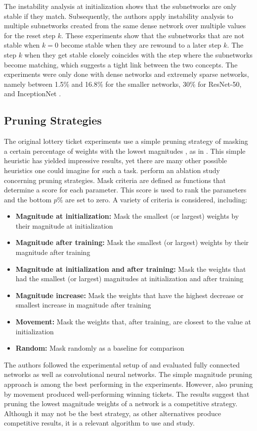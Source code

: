 The instability analysis at initialization shows that the subnetworks are only stable if they match.
Subsequently, the authors apply instability analysis to multiple subnetworks created from the same dense network over multiple values for the reset step $k$.
These experiments show that the subnetworks that are not stable when $k=0$ become stable when they are rewound to a later step $k$.
The step $k$ when they get stable closely coincides with the step where the subnetworks become matching, which suggests a tight link between the two concepts.
The experiments were only done with dense networks and extremely sparse networks, namely between 1.5\% and 16.8\% for the smaller networks, 30\% for ResNet-50, and InceptionNet \autocite{LinearModeConnectivity}.

\subsection{Pruning Strategies}
The original lottery ticket experiments use a simple pruning strategy of masking a certain percentage of weights with the lowest magnitudes \autocite{LTH}, as in \autocite{HanEtAl15}. This simple heuristic has yielded impressive results, yet there are many other possible heuristics one could imagine for such a task.
\textcite{Supermasks} perform an ablation study concerning pruning strategies. Mask criteria are defined as functions that determine a score for each parameter. This score is used to rank the parameters and the bottom $p\%$ are set to zero.
A variety of criteria is considered, including: 
\begin{itemize}
\item \textbf{Magnitude at initialization:} Mask the smallest (or largest) weights by their magnitude at initialization
\item \textbf{Magnitude after training:} Mask the smallest (or largest) weights by their magnitude after training
\item \textbf{Magnitude at initialization and after training:} Mask the weights that had the smallest (or largest) magnitudes at initialization and after training
\item \textbf{Magnitude increase:} Mask the weights that have the highest decrease or smallest increase in magnitude after training
\item \textbf{Movement:} Mask the weights that, after training, are closest to the value at initialization
\item \textbf{Random:} Mask randomly as a baseline for comparison
\end{itemize}
The authors followed the experimental setup of \textcite{LTH} and evaluated fully connected networks as well as convolutional neural networks.
The simple magnitude pruning approach is among the best performing in the experiments.
However, also pruning by movement produced well-performing winning tickets.
The results suggest that pruning the lowest magnitude weights of a network is a competitive strategy.
Although it may not be the best strategy, as other alternatives produce competitive results, it is a relevant algorithm to use and study. 

